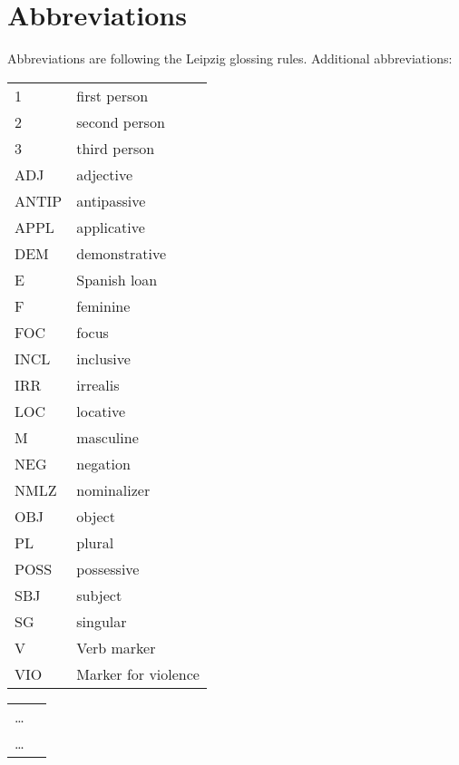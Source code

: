 \documentclass[output=paper,colorlinks,citecolor=brown
]{langscibook}
\begin{document}
\section*{Abbreviations}
Abbreviations are following the Leipzig glossing rules. Additional abbreviations:
\begin{tabularx}{.5\textwidth}{@{}lQ@{}}
1 & first person\\
2 & second person\\
3 & third person\\
ADJ & adjective\\
ANTIP & antipassive\\
APPL & applicative\\
DEM & demonstrative\\
E & Spanish loan\\
F & feminine\\
FOC & focus\\
INCL & inclusive\\
IRR & irrealis\\
LOC & locative\\
M & masculine\\
NEG & negation\\
NMLZ & nominalizer\\
OBJ & object\\
PL & plural\\
POSS & possessive\\
SBJ & subject\\
SG & singular\\
V & Verb marker\\
VIO & Marker for violence\\ 
\end{tabularx}%
\begin{tabularx}{.5\textwidth}{@{}lQ@{}}
 \ldots  & \\
 \ldots  & \\
\end{tabularx}

\sloppy
\printbibliography[heading=subbibliography,notkeyword=this]
\end{document}

